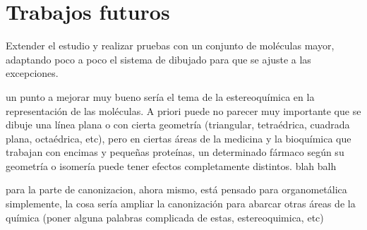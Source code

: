 \section{Trabajos futuros}

Extender el estudio y realizar pruebas con un conjunto de moléculas mayor, adaptando poco a poco el sistema de dibujado para que se ajuste a las excepciones.

un punto a mejorar muy bueno sería el tema de la estereoquímica en la representación de las moléculas. A priori puede no parecer muy importante que se dibuje una línea plana o con cierta geometría (triangular, tetraédrica, cuadrada plana, octaédrica, etc), pero en ciertas áreas de la medicina y la bioquímica que trabajan con encimas y pequeñas proteínas, un determinado fármaco según su geometría o isomería puede tener efectos completamente distintos.
blah balh

para la parte de canonizacion, ahora mismo, está pensado para organometálica simplemente, la cosa sería ampliar la canonización para abarcar otras áreas de la química (poner alguna palabras complicada de estas, estereoquimica, etc)